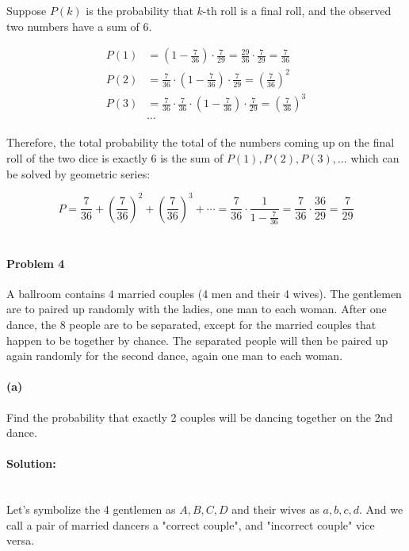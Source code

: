\documentclass[a4paper, 11pt, twoside]{article}
\begin{document}
Suppose $P(k)$ is the probability that $k$-th roll is a final roll, and the observed two numbers have a sum of $6$.

\[
\begin{split}
	P(1)&=(1-\frac{7}{36})\cdot\frac{7}{29}=\frac{29}{36}\cdot\frac{7}{29}=\frac{7}{36}\\
	P(2)&=\frac{7}{36}\cdot(1-\frac{7}{36})\cdot\frac{7}{29} = \left(\frac{7}{36}\right)^2\\
	P(3)&=\frac{7}{36}\cdot\frac{7}{36}\cdot(1-\frac{7}{36})\cdot\frac{7}{29}=\left(\frac{7}{36}\right)^3\\
	&\cdots
\end{split}
\]

Therefore, the total probability the total of the numbers coming up on the final roll of the two dice is exactly $6$ is the sum of $P(1), P(2), P(3), \dots$ which can be solved by geometric series:

\[P = \frac{7}{36} + \left(\frac{7}{36}\right)^2 + \left(\frac{7}{36}\right)^3 + \cdots = \frac{7}{36}\cdot\frac{1}{1-\frac{7}{36}}=\frac{7}{36}\cdot\frac{36}{29}=\frac{7}{29}\]\\

\pagebreak

\paragraph{Problem 4}

A ballroom contains 4 married couples (4 men and their 4 wives). The gentlemen are to paired up randomly with the ladies, one man to each woman. After one dance, the 8 people are to be separated, except for the married couples that happen to be together by chance. The separated people will then be paired up again randomly for the second dance, again one man to each woman.

\paragraph{(a)} Find the probability that exactly 2 couples will be dancing together on the 2nd dance.

\paragraph{Solution:}\ \\

Let's symbolize the 4 gentlemen as $A,B,C,D$ and their wives as $a,b,c,d$. And we call a pair of married dancers a "correct couple", and "incorrect couple" vice versa.
\end{document}

